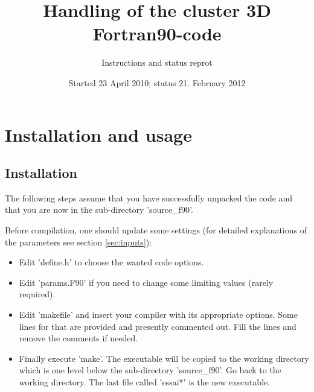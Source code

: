 \documentclass[12pt]{article}
\begin{document}
\title{Handling of the cluster 3D Fortran90-code}
\author{Instructions and status reprot}
\date{Started 23 April 2010; status 21. February 2012}
\maketitle

\tableofcontents
\newpage

\section{Installation and usage}

\subsection{Installation}
The following steps assume that you have successfully unpacked
the code and that you are now in the sub-directory 'source\_f90'.

Before compilation, one should update some settings
(for detailed explanations of the parameters see section \ref{sec:inputs}):
\begin{itemize}
\item
 Edit 'define.h' to choose the wanted code options.
\item
 Edit 'params.F90' if you need to change some limiting values
 (rarely required).
\item
 Edit 'makefile' and insert your compiler with its appropriate
 options. Some lines for that are provided and presently commented out.
 Fill the lines and remove the comments if needed.
\item
 Finally execute 'make'. The executable will be copied to the working
 directory which is one level below the sub-directory 'source\_f90'.
 Go back to the working directory. The last file called 'essai*' is
 the new executable.
\end{itemize}
\end{document}
